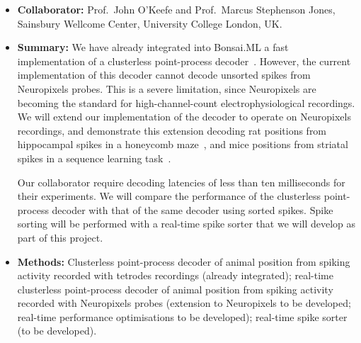 
\begin{itemize}

    \item\textbf{Collaborator:} Prof.~John O'Keefe and Prof.~Marcus Stephenson
        Jones, Sainsbury Wellcome Center, University College London, UK.

    \item\textbf{Summary:} We have already integrated into Bonsai.ML a fast
        implementation of a clusterless point-process decoder~\citep[i.e., a
        decoder that does not require spike sorting and is suitable for
        real-time usage;][]{denovellisEtAl21}. However, the current
        implementation of this decoder cannot decode unsorted spikes from
        Neuropixels probes.
        This is a severe limitation, since Neuropixels are becoming the standard
        for high-channel-count electrophysiological recordings.
        We will extend our implementation of the decoder to operate on
        Neuropixels recordings, and demonstrate this extension decoding rat
        positions from hippocampal spikes in a honeycomb
        maze~\citep{woodEtAl18}, and mice positions from striatal spikes in a
        sequence learning task~\citep{thompsonEtAl24}.

        Our collaborator require decoding latencies of less than ten
        milliseconds for their experiments. We will compare the performance of
        the clusterless point-process decoder with that of the same decoder
        using sorted spikes.
        Spike sorting will be performed with a real-time spike sorter that we
        will develop as part of this project.

    \item\textbf{Methods:} Clusterless point-process decoder of animal position
        from spiking activity recorded with tetrodes recordings (already
        integrated); real-time clusterless point-process decoder of animal
        position from spiking activity recorded with Neuropixels probes
        (extension to Neuropixels to be developed; real-time performance
        optimisations to be developed); real-time spike sorter (to be
        developed).

\end{itemize}



